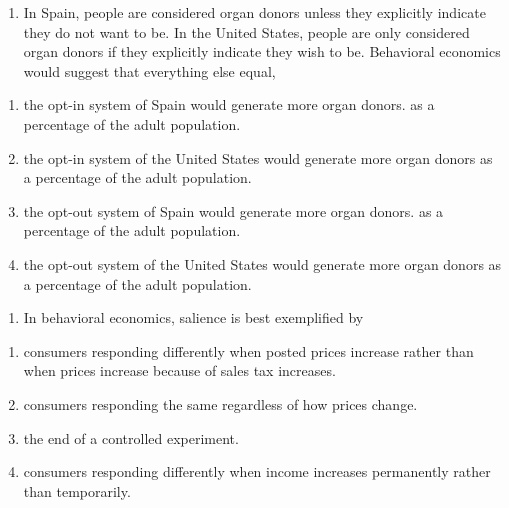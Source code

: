 \documentclass[11pt,]{article}
\providecommand{\tightlist}{%
  \setlength{\itemsep}{0pt}\setlength{\parskip}{0pt}}
\begin{document}
\begin{enumerate}
\def\labelenumi{\arabic{enumi})}
\setcounter{enumi}{18}
\tightlist
\item
  In Spain, people are considered organ donors unless they explicitly
  indicate they do not want to be. In the United States, people are only
  considered organ donors if they explicitly indicate they wish to be.
  Behavioral economics would suggest that everything else equal,
\end{enumerate}

\begin{enumerate}
\def\labelenumi{\Alph{enumi})}
\tightlist
\item
  the opt-in system of Spain would generate more organ donors. as a
  percentage of the adult population.
\item
  the opt-in system of the United States would generate more organ
  donors as a percentage of the adult population.
\item
  the opt-out system of Spain would generate more organ donors. as a
  percentage of the adult population.
\item
  the opt-out system of the United States would generate more organ
  donors as a percentage of the adult population.
\end{enumerate}

\newpage

\begin{enumerate}
\def\labelenumi{\arabic{enumi})}
\setcounter{enumi}{19}
\tightlist
\item
  In behavioral economics, salience is best exemplified by
\end{enumerate}

\begin{enumerate}
\def\labelenumi{\Alph{enumi})}
\tightlist
\item
  consumers responding differently when posted prices increase rather
  than when prices increase because of sales tax increases.
\item
  consumers responding the same regardless of how prices change.
\item
  the end of a controlled experiment.
\item
  consumers responding differently when income increases permanently
  rather than temporarily.
\end{enumerate}
\end{document}
